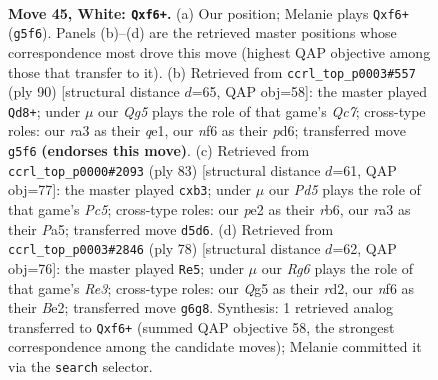 \documentclass[11pt]{article}
\begin{document}
\clearpage

\begin{figure}[p]\centering
\begin{subfigure}{0.46\textwidth}\centering
\resizebox{\linewidth}{!}{%
\newchessgame
\chessboard[
  setfen={4b3/4k3/5nR1/3P2Q1/8/r5p1/P1P1p1P1/4K3 w - - 6 45},
  showmover=false,
  pgfstyle=straightmove, color=movearrow, markmove={g5-f6}
]}
\caption{}
\end{subfigure}\hfill
\begin{subfigure}{0.46\textwidth}\centering
\resizebox{\linewidth}{!}{%
\newchessgame
\chessboard[
  setfen={1R6/2Qnk3/3p3p/4b3/P3P1pP/3P2P1/6K1/4q3 w - - 8 46},
  showmover=false,
  pgfstyle=straightmove, color=movearrow, markmove={c7-d8}
]}
\caption{}
\end{subfigure}
\\[4pt]
\begin{subfigure}{0.46\textwidth}\centering
\resizebox{\linewidth}{!}{%
\newchessgame
\chessboard[
  setfen={8/7k/1R6/p3B2p/1PpK2p1/P3N3/5q1P/8 b - b3 0 42},
  showmover=false,
  pgfstyle=straightmove, color=movearrow, markmove={c4-b3}
]}
\caption{}
\end{subfigure}\hfill
\begin{subfigure}{0.46\textwidth}\centering
\resizebox{\linewidth}{!}{%
\newchessgame
\chessboard[
  setfen={3n1k2/7p/4b1pP/2r5/3b4/Q3R3/P2rB1K1/8 w - - 7 40},
  showmover=false,
  pgfstyle=straightmove, color=movearrow, markmove={e3-e5}
]}
\caption{}
\end{subfigure}
\caption{\textbf{Move 45, White: \texttt{Qxf6+}.} (a) Our position; Melanie plays \texttt{Qxf6+} (\texttt{g5f6}). Panels (b)--(d) are the retrieved master positions whose correspondence most drove this move (highest QAP objective among those that transfer to it). (b) Retrieved from \texttt{ccrl\_top\_p0003\#557} (ply 90) [structural distance $d$=65, QAP obj=58]: the master played \texttt{Qd8+}; under $\mu$ our \emph{Qg5} plays the role of that game's \emph{Qc7}; cross-type roles: our \emph{r}a3 as their \emph{q}e1, our \emph{n}f6 as their \emph{p}d6; transferred move \texttt{g5f6} \textbf{(endorses this move)}. (c) Retrieved from \texttt{ccrl\_top\_p0000\#2093} (ply 83) [structural distance $d$=61, QAP obj=77]: the master played \texttt{cxb3}; under $\mu$ our \emph{Pd5} plays the role of that game's \emph{Pc5}; cross-type roles: our \emph{p}e2 as their \emph{r}b6, our \emph{r}a3 as their \emph{P}a5; transferred move \texttt{d5d6}. (d) Retrieved from \texttt{ccrl\_top\_p0003\#2846} (ply 78) [structural distance $d$=62, QAP obj=76]: the master played \texttt{Re5}; under $\mu$ our \emph{Rg6} plays the role of that game's \emph{Re3}; cross-type roles: our \emph{Q}g5 as their \emph{r}d2, our \emph{n}f6 as their \emph{B}e2; transferred move \texttt{g6g8}. Synthesis: 1 retrieved analog transferred to \texttt{Qxf6+} (summed QAP objective 58, the strongest correspondence among the candidate moves); Melanie committed it via the \texttt{search} selector.}
\label{fig:thought-m88}
\end{figure}
\end{document}
